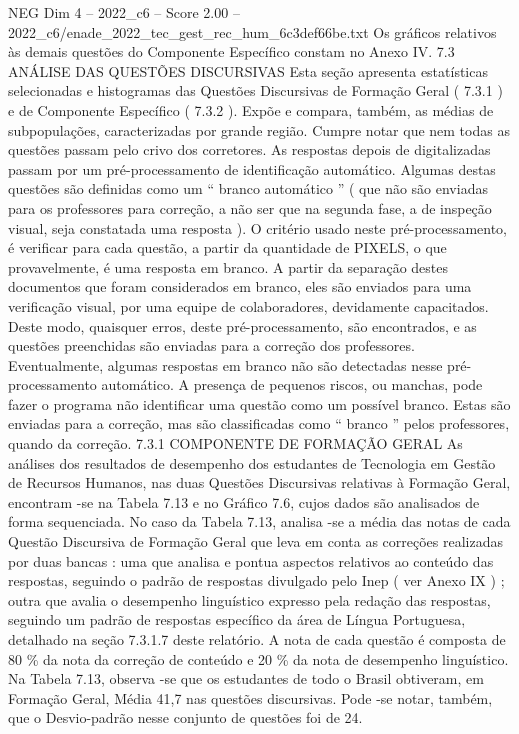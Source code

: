 \begin{textsample}{NEG Dim 4 – 2022\_c6 – Score 2.00 – 2022\_c6/enade\_2022\_tec\_gest\_rec\_hum\_6c3def66be.txt}
Os gráficos relativos às demais questões do Componente Específico constam no Anexo IV. 7.3 ANÁLISE DAS QUESTÕES DISCURSIVAS Esta seção apresenta estatísticas selecionadas e histogramas das Questões Discursivas de Formação Geral ( 7.3.1 ) e de Componente Específico ( 7.3.2 ).
Expõe e compara, também, as médias de subpopulações, caracterizadas por grande região.
Cumpre notar que nem todas as questões passam pelo crivo dos corretores.
As respostas depois de digitalizadas passam por um pré-processamento de identificação automático.
Algumas destas questões são definidas como um “ branco automático ” ( que não são enviadas para os professores para correção, a não ser que na segunda fase, a de inspeção visual, seja constatada uma resposta ).
O critério usado neste pré-processamento, é verificar para cada questão, a partir da quantidade de PIXELS, o que provavelmente, é uma resposta em branco.
A partir da separação destes documentos que foram considerados em branco, eles são enviados para uma verificação visual, por uma equipe de colaboradores, devidamente capacitados.
Deste modo, quaisquer erros, deste pré-processamento, são encontrados, e as questões preenchidas são enviadas para a correção dos professores.
Eventualmente, algumas respostas em branco não são detectadas nesse pré-processamento automático.
A presença de pequenos riscos, ou manchas, pode fazer o programa não identificar uma questão como um possível branco.
Estas são enviadas para a correção, mas são classificadas como “ branco ” pelos professores, quando da correção. 7.3.1 COMPONENTE DE FORMAÇÃO GERAL As análises dos resultados de desempenho dos estudantes de Tecnologia em Gestão de Recursos Humanos, nas duas Questões Discursivas relativas à Formação Geral, encontram -se na Tabela 7.13 e no Gráfico 7.6, cujos dados são analisados de forma sequenciada.
No caso da Tabela 7.13, analisa -se a média das notas de cada Questão Discursiva de Formação Geral que leva em conta as correções realizadas por duas bancas : uma que analisa e pontua aspectos relativos ao conteúdo das respostas, seguindo o padrão de respostas divulgado pelo Inep ( ver Anexo IX ) ; outra que avalia o desempenho linguístico expresso pela redação das respostas, seguindo um padrão de respostas específico da área de Língua Portuguesa, detalhado na seção 7.3.1.7 deste relatório.
A nota de cada questão é composta de 80 \% da nota da correção de conteúdo e 20 \% da nota de desempenho linguístico.
Na Tabela 7.13, observa -se que os estudantes de todo o Brasil obtiveram, em Formação Geral, Média 41,7 nas questões discursivas.
Pode -se notar, também, que o Desvio-padrão nesse conjunto de questões foi de 24.

\end{textsample}
